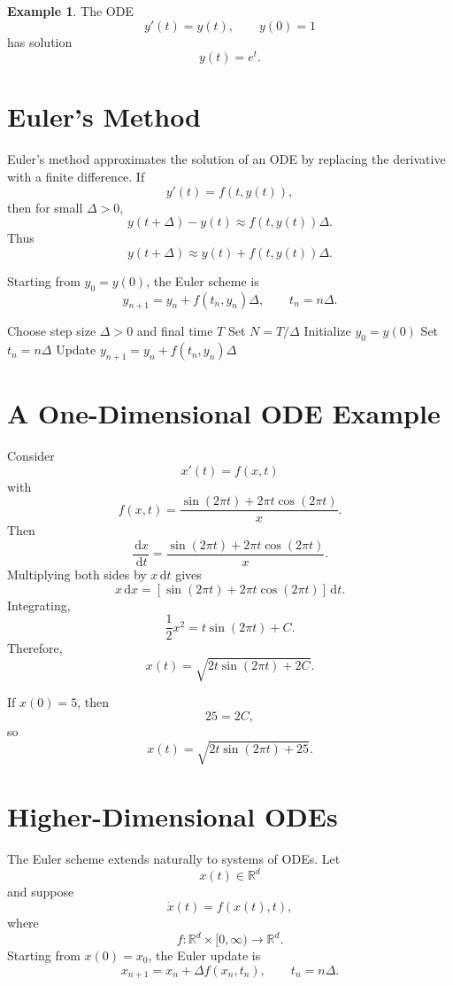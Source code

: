 \documentclass[12pt,oneside]{book}
\numberwithin{equation}{section}
\theoremstyle{definition}
\newtheorem{example}{Example}[section]
\theoremstyle{plain}
\theoremstyle{remark}
\newcommand{\R}{\mathbb{R}}
\newcommand{\dd}{\,\mathrm{d}}
\begin{document}
\begin{example}
The ODE
\[
y'(t)=y(t), \qquad y(0)=1
\]
has solution
\[
y(t)=e^t.
\]
\end{example}

\section{Euler's Method}

Euler's method approximates the solution of an ODE by replacing the derivative with a finite difference. If
\[
y'(t)=f(t,y(t)),
\]
then for small $\Delta>0$,
\[
y(t+\Delta)-y(t)\approx f(t,y(t))\Delta.
\]
Thus
\[
y(t+\Delta)\approx y(t)+f(t,y(t))\Delta.
\]

Starting from $y_0=y(0)$, the Euler scheme is
\[
y_{n+1}=y_n+f(t_n,y_n)\Delta,
\qquad
t_n=n\Delta.
\]

\begin{algorithm}[H]
\caption{Euler's Method}
\begin{algorithmic}[1]
\State Choose step size $\Delta>0$ and final time $T$
\State Set $N=T/\Delta$
\State Initialize $y_0=y(0)$
    \State Set $t_n=n\Delta$
    \State Update $y_{n+1}=y_n+f(t_n,y_n)\Delta$
\EndFor
\end{algorithmic}
\end{algorithm}

\section{A One-Dimensional ODE Example}

Consider
\[
x'(t)=f(x,t)
\]
with
\[
f(x,t)=\frac{\sin(2\pi t)+2\pi t\cos(2\pi t)}{x}.
\]
Then
\[
\frac{\dd x}{\dd t}
=
\frac{\sin(2\pi t)+2\pi t\cos(2\pi t)}{x}.
\]
Multiplying both sides by $x\dd t$ gives
\[
x\dd x
=
\left[\sin(2\pi t)+2\pi t\cos(2\pi t)\right]\dd t.
\]
Integrating,
\[
\frac{1}{2}x^2
=
t\sin(2\pi t)+C.
\]
Therefore,
\[
x(t)=\sqrt{2t\sin(2\pi t)+2C}.
\]

If $x(0)=5$, then
\[
25=2C,
\]
so
\[
x(t)=\sqrt{2t\sin(2\pi t)+25}.
\]

\section{Higher-Dimensional ODEs}

The Euler scheme extends naturally to systems of ODEs. Let
\[
x(t)\in \R^d
\]
and suppose
\[
\dot{x}(t)=f(x(t),t),
\]
where
\[
f:\R^d\times [0,\infty)\to \R^d.
\]
Starting from $x(0)=x_0$, the Euler update is
\[
x_{n+1}=x_n+\Delta f(x_n,t_n),
\qquad
t_n=n\Delta.
\]
\end{document}
